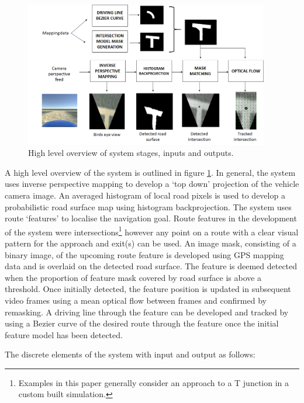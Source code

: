 \documentclass[]{aiaa-tc}%
\begin{document}
\begin{figure}
	\centering
	\includegraphics[width=0.95\textwidth]{systemOverview.png}
	\caption{High level overview of system stages, inputs and outputs.}
	\label{f:systemOverview}
\end{figure}


A high level overview of the system is outlined in figure \ref{f:systemOverview}. In general, the system uses inverse perspective mapping to develop a `top down' projection of the vehicle camera image. An averaged histogram of local road pixels is used to develop a probabilistic road surface map using histogram backprojection. The system uses route `features' to localise the navigation goal. Route features in the development of the system were intersections\footnote{Examples in this paper generally consider an approach to a T junction in a custom built simulation.} however any point on a route with a clear visual pattern for the approach and exit(s) can be used. An image mask, consisting of a binary image, of the upcoming route feature is developed using GPS mapping data and is overlaid on the detected road surface. The feature is deemed detected when the proportion of feature mask covered by road surface is above a threshold. Once initially detected, the feature position is updated in subsequent video frames using a mean optical flow between frames and confirmed by remasking. A driving line through the feature can be developed and tracked by using a Bezier curve of the desired route through the feature once the initial feature model has been detected.

The discrete elements of the system with input and output as follows: 
\end{document}

